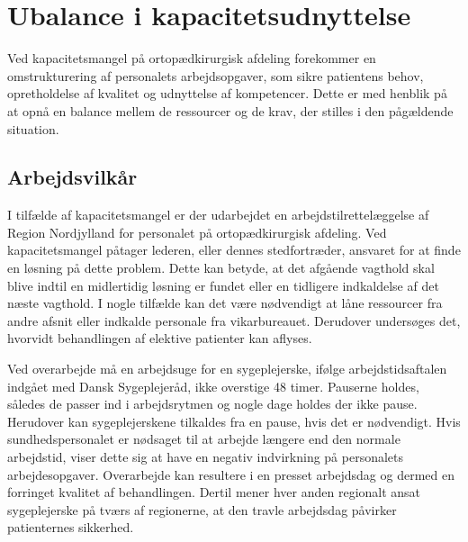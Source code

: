 \section{Ubalance i kapacitetsudnyttelse}
Ved kapacitetsmangel på ortopædkirurgisk afdeling forekommer en omstrukturering af personalets arbejdsopgaver, som sikre patientens behov, opretholdelse af kvalitet og udnyttelse af kompetencer. Dette er med henblik på at opnå en balance mellem de ressourcer og de krav, der stilles i den pågældende situation.\cite{Bjerg2016}  %

\subsection{Arbejdsvilkår} \label{Per_sik}

I tilfælde af kapacitetsmangel er der udarbejdet en arbejdstilrettelæggelse af Region Nordjylland for personalet på ortopædkirurgisk afdeling. Ved kapacitetsmangel påtager lederen, eller dennes stedfortræder, ansvaret for at finde en løsning på dette problem. Dette kan betyde, at det afgående vagthold skal blive indtil en midlertidig løsning er fundet eller en tidligere indkaldelse af det næste vagthold. I nogle tilfælde kan det være nødvendigt at låne ressourcer fra andre afsnit eller indkalde personale fra vikarbureauet. Derudover undersøges det, hvorvidt behandlingen af elektive patienter kan aflyses.\cite{Bjerg2016} 

Ved overarbejde må en arbejdsuge for en sygeplejerske, ifølge arbejdstidsaftalen indgået med Dansk Sygeplejeråd, ikke overstige 48 timer\cite{Danske2015}. Pauserne holdes, således de passer ind i arbejdsrytmen og nogle dage holdes der ikke pause. Herudover kan sygeplejerskene tilkaldes fra en pause, hvis det er nødvendigt. Hvis sundhedspersonalet er nødsaget til at arbejde længere end den normale arbejdstid, viser dette sig at have en negativ indvirkning på personalets arbejdesopgaver\cite{Dinges2004}. Overarbejde kan resultere i en presset arbejdsdag og dermed en forringet kvalitet af behandlingen\cite{Kjeldsen2015}. Dertil mener hver anden regionalt ansat sygeplejerske på tværs af regionerne, at den travle arbejdsdag påvirker patienternes sikkerhed\cite{Kjeldsen2015}.

